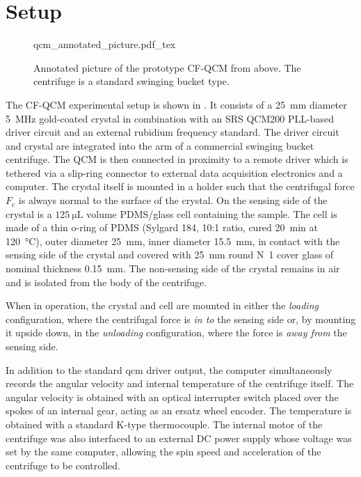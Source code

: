 \section{Setup}
\begin{figure}[ht]
\centering
{qcm_annotated_picture.pdf_tex}
\caption{Annotated picture of the prototype CF-QCM from above.  The
centrifuge is a standard swinging bucket type.}
\label{fig:cfqcmexpsetup}
\end{figure}

The CF-QCM experimental setup is shown in .  It
consists of a \SI{25}{\milli\meter} diameter \SI{5}{\mega\hertz} gold-coated
crystal in combination with an SRS QCM200 PLL-based driver circuit and an
external rubidium frequency standard.  The driver circuit and crystal are
integrated into the arm of a commercial swinging bucket centrifuge.  The QCM
is then connected in proximity to a remote driver which is tethered via
a slip-ring connector to external data acquisition electronics and a computer.
The crystal itself is mounted in a holder such that the centrifugal force
$F_\mathrm{c}$ is always normal to the surface of the crystal.  On the sensing
side of the crystal is a $\SI{125}{\micro\liter}$ volume PDMS/glass cell
containing the sample.  The cell is made of a thin o-ring of PDMS (Sylgard
184, 10:1 ratio, cured \SI{20}{\minute} at \SI{120}{\celsius}), outer diameter
\SI{25}{\milli\meter}, inner diameter \SI{15.5}{\milli\meter}, in contact with
the sensing side of the crystal and covered with \SI{25}{\milli\meter} round
N~1 cover glass of nominal thickness
\SI{0.15}{\milli\meter}.  The non-sensing side of the crystal remains in air
and is isolated from the body of the centrifuge.

When in operation, the crystal and cell are mounted in either the
\textit{loading} configuration, where the centrifugal force is \textit{in
to} the sensing side or, by mounting it upside down, in the
\textit{unloading} configuration, where the force is \textit{away from} the
sensing side.

In addition to the standard \gls{qcm} driver output, the computer simultaneously
records the angular velocity and internal temperature of the centrifuge
itself.  The angular velocity is obtained with an optical interrupter
switch placed over the spokes of an internal gear, acting as an ersatz
wheel encoder.  The temperature is obtained with a standard K-type
thermocouple.  The internal motor of the centrifuge was also interfaced to
an external DC power supply whose voltage was set by the same
computer, allowing the spin speed and acceleration of the centrifuge to be
controlled.

